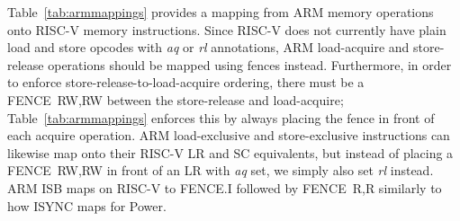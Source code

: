 Table~\ref{tab:armmappings} provides a mapping from ARM memory operations onto RISC-V memory instructions.
Since RISC-V does not currently have plain load and store opcodes with {\em aq} or {\em rl} annotations, ARM load-acquire and store-release operations should be mapped using fences instead.
Furthermore, in order to enforce store-release-to-load-acquire ordering, there must be a FENCE~RW,RW between the store-release and load-acquire; Table~\ref{tab:armmappings} enforces this by always placing the fence in front of each acquire operation.
ARM load-exclusive and store-exclusive instructions can likewise map onto their RISC-V LR and SC equivalents, but instead of placing a FENCE~RW,RW in front of an LR with {\em aq} set, we simply also set {\em rl} instead.
ARM ISB maps on RISC-V to FENCE.I followed by FENCE~R,R similarly to how ISYNC maps for Power.


